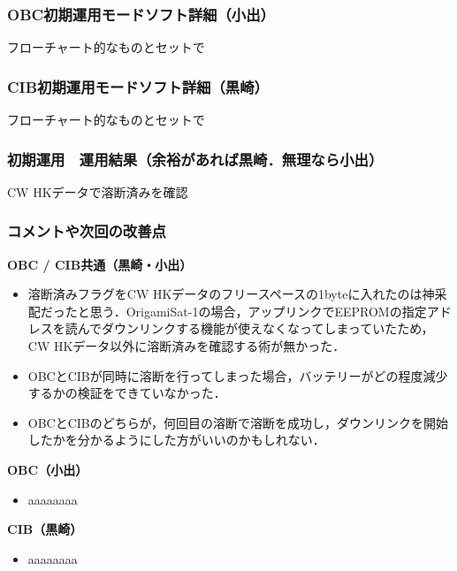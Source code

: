 \subsubsection{OBC初期運用モードソフト詳細（小出）}
フローチャート的なものとセットで

\subsubsection{CIB初期運用モードソフト詳細（黒崎）}
フローチャート的なものとセットで

\subsubsection{初期運用　運用結果（余裕があれば黒崎．無理なら小出）}
CW HKデータで溶断済みを確認

\subsubsection{コメントや次回の改善点}
\hspace{2ex}
\textbf{OBC / CIB共通（黒崎・小出）}
\begin{itemize}
	\item 溶断済みフラグをCW HKデータのフリースペースの1byteに入れたのは神采配だったと思う．OrigamiSat-1の場合，アップリンクでEEPROMの指定アドレスを読んでダウンリンクする機能が使えなくなってしまっていたため，CW HKデータ以外に溶断済みを確認する術が無かった．
	\item OBCとCIBが同時に溶断を行ってしまった場合，バッテリーがどの程度減少するかの検証をできていなかった．
	\item OBCとCIBのどちらが，何回目の溶断で溶断を成功し，ダウンリンクを開始したかを分かるようにした方がいいのかもしれない．
\end{itemize}

\hspace{2ex}
\textbf{OBC（小出）}
\begin{itemize}
	\item aaaaaaaa
\end{itemize}

\hspace{2ex}
\textbf{CIB（黒崎）}
\begin{itemize}
	\item aaaaaaaa
\end{itemize}